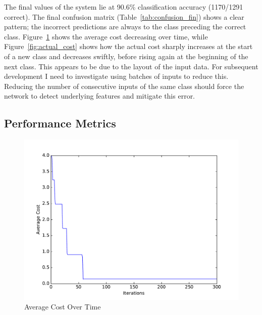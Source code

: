 The final values of the system lie at 90.6\% classification accuracy (1170/1291 correct). The final confusion matrix (Table~\ref{tab:confusion_fin}) shows a clear pattern; the incorrect predictions are always to the class preceding the correct class. Figure~\ref{fig:avg_cost} shows the average cost decreasing over time, while Figure~\ref{fig:actual_cost} shows how the actual cost sharply increases at the start of a new class and decreases swiftly, before rising again at the beginning of the next class. This appears to be due to the layout of the input data. For subsequent development I need to investigate using batches of inputs to reduce this. Reducing the number of consecutive inputs of the same class should force the network to detect underlying features and mitigate this error.

\subsection{Performance Metrics}




\begin{figure}
	\centering
	\includegraphics[width=\textwidth]{figures/multilayer_perceptron_average_cost}
	\caption{Average Cost Over Time}
	\label{fig:avg_cost}
	\centering
\end{figure}

